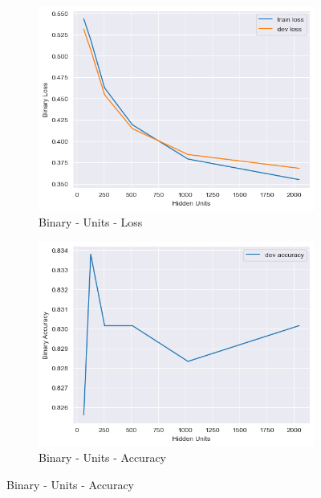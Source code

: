 \documentclass[12pt]{article}
\theoremstyle{definitionstyle}
\begin{document}
\begin{enumerate}
        \begin{figure}[H]
            \centering
        
            \begin{subfigure}{0.35\textwidth}
                \includegraphics[width=\textwidth]{images/binary_units_loss.png}
                \caption{Binary - Units - Loss}
            \end{subfigure}
            \hfill
            \begin{subfigure}{0.35\textwidth}
                \includegraphics[width=\textwidth]{images/binary_units_acc.png}
                \caption{Binary - Units - Accuracy}
            \end{subfigure}
        

\end{figure}
\end{enumerate}
\end{document}
